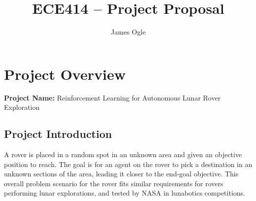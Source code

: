 \documentclass[12pt]{article}
\author{James Ogle}
\title{ECE414 -- Project Proposal}
\begin{document}
\maketitle
{}
\section*{Project Overview}
\textbf{Project Name:} Reinforcement Learning for Autonomous Lunar Rover Exploration
\subsection*{Project Introduction}
A rover is placed in a random spot in an unknown area and given an objective position to reach.
The goal is for an agent on the rover to pick a destination in an unknown sections of the area, leading it closer to the end-goal objective.
This overall problem scenario for the rover fits similar requirements for rovers performing lunar explorations, and tested by NASA in lunabotics competitions.

\end{document}
